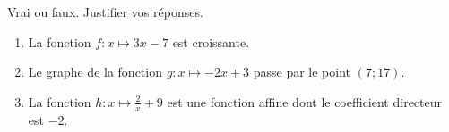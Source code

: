 
\begin{exercice}\label{exosmath-0509}

    Vrai ou faux. Justifier vos réponses.
    \begin{enumerate}
        \item
            La fonction \( f\colon x\mapsto 3x-7\) est croissante.
        \item
            Le graphe de la fonction \( g\colon x\mapsto -2x+3\) passe par le point \( (7;17)\).
        \item
            La fonction \( h\colon x\mapsto \frac{ 2 }{ x }+9\) est une fonction affine dont le coefficient directeur est \( -2\).
    \end{enumerate}

\end{exercice}
